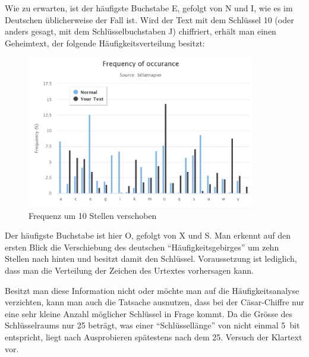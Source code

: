 \documentclass[10pt,a4paper]{article}
\begin{document}
\noindent
Wie zu erwarten, ist der häufigste Buchstabe E, gefolgt von N und I, wie es im Deutschen üblicherweise der Fall ist. Wird der Text mit dem Schlüssel 10 (oder anders gesagt, mit dem Schlüsselbuchstaben J) chiffriert, erhält man einen Geheimtext, der folgende Häufigkeitsverteilung besitzt:
\begin{figure}[H]
    \begin{center}
    \includegraphics[width=10cm]{images/frequency1.png}
    \caption{Frequenz um 10 Stellen verschoben}
    \label{frequencycaesar}
    \end{center}
\end{figure}

\noindent
Der häufigste Buchstabe ist hier O, gefolgt von X und S. Man erkennt auf den ersten Blick die Verschiebung des deutschen "`Häufigkeitsgebirges"' um zehn Stellen nach hinten und besitzt damit den Schlüssel. Voraussetzung ist lediglich, dass man die Verteilung der Zeichen des Urtextes vorhersagen kann.

\noindent
Besitzt man diese Information nicht oder möchte man auf die Häufigkeitsanalyse verzichten, kann man auch die Tatsache ausnutzen, dass bei der Cäsar-Chiffre nur eine sehr kleine Anzahl möglicher Schlüssel in Frage kommt. Da die Grösse des Schlüsselraums nur 25 beträgt, was einer "`Schlüssellänge"' von nicht einmal 5~bit entspricht, liegt nach Ausprobieren spätestens nach dem 25. Versuch der Klartext vor.
\end{document}
